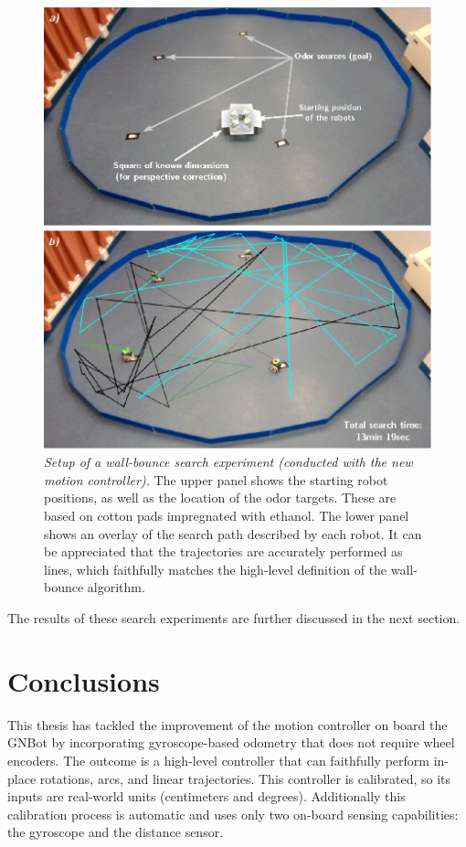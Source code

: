\documentclass[12pt,twoside]{report}
\begin{document}
\begin{figure}[hbtp]
\centerline{\includegraphics[width=0.84\linewidth]{search_experiment_setup}}
\caption[Setup of a wall-bounce search experiment (conducted with the new motion controller)]{\emph{Setup of a wall-bounce search experiment (conducted with the new motion controller).}
The upper panel shows the starting robot positions, as well as the location of the odor targets. These are based on cotton pads impregnated with ethanol. The lower panel shows an overlay of the search path described by each robot.
It can be appreciated that the trajectories are accurately performed as lines, which faithfully matches the high-level definition of the wall-bounce algorithm.
}
\label{fig:search_experiment_setup}
\end{figure}

The results of these search experiments are further discussed in the next section.







\chapter{Conclusions} \label{sec:concl_chap}

This thesis has tackled the improvement of the motion controller on board the GNBot by incorporating gyroscope-based odometry that does not require wheel encoders.
The outcome is a high-level controller that can faithfully perform in-place rotations, arcs, and linear trajectories. This controller is calibrated, so its inputs are real-world units (centimeters and degrees). Additionally this calibration process is automatic and uses only two on-board sensing capabilities: the gyroscope and the distance sensor.
\end{document}
